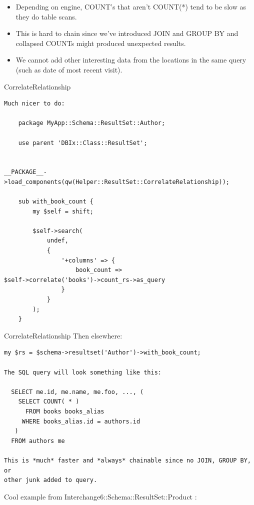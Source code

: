 \begin{itemize}
\item Depending on engine, COUNT’s that aren’t COUNT(*) tend to be slow as
they do table scans.
\item This is hard to chain since we've introduced JOIN and GROUP BY and
collapsed COUNTs might produced unexpected results.
\item We cannot add other interesting data from the locations in the same query (such as date of most recent visit).
\end{itemize}

\begin{frame}[fragile]{CorrelateRelationship}
\begin{lstlisting}
Much nicer to do:

    package MyApp::Schema::ResultSet::Author;

    use parent 'DBIx::Class::ResultSet';

   
__PACKAGE__->load_components(qw(Helper::ResultSet::CorrelateRelationship));

    sub with_book_count {
        my $self = shift;

        $self->search(
            undef,
            {
                '+columns' => {
                    book_count =>
$self->correlate('books')->count_rs->as_query
                }
            }
        );
    }
\end{lstlisting}
\end{frame}

\begin{frame}[fragile]{CorrelateRelationship}
Then elsewhere:

\begin{lstlisting}
my $rs = $schema->resultset('Author')->with_book_count;

The SQL query will look something like this:

  SELECT me.id, me.name, me.foo, ..., (
    SELECT COUNT( * )
      FROM books books_alias
     WHERE books_alias.id = authors.id
   )
  FROM authors me

This is *much* faster and *always* chainable since no JOIN, GROUP BY, or
other junk added to query.
\end{lstlisting}
\end{frame}

Cool example from Interchange6::Schema::ResultSet::Product :

